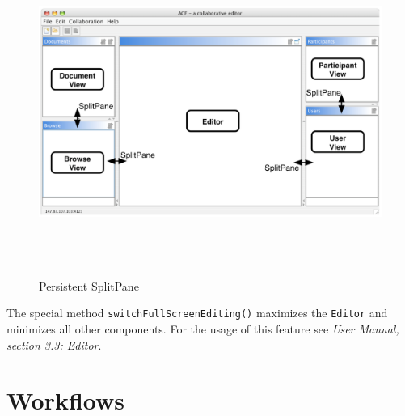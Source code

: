 \begin{figure}[H]
\begin{center}
  \includegraphics[height=4.19in, width=6.69in]{../images/finalreport/application_splitpane.eps}
\caption{Persistent SplitPane}
\label{application_splitpane}
\end{center}
\end{figure}

The special method \texttt{switchFullScreenEditing()} maximizes the \texttt{Editor} and minimizes all other components. For the usage of this feature see \emph{User Manual, section 3.3: Editor}.



\section{Workflows}

